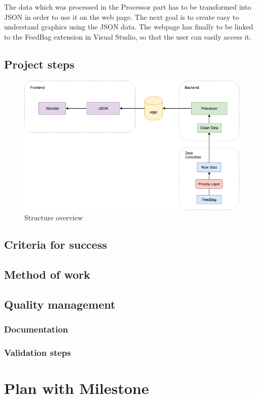 \documentclass{seal_article}
\begin{document}
The data which was processed in the Processor part has to be transformed into JSON in order to use it on the web page. The next goal is to create easy to understand graphics using the JSON data. The webpage has finally to be linked to the FeedBag extension in Visual Studio, so that the user can easily access it.

\subsection{Project steps}
\begin{figure}
  \includegraphics[width=\linewidth]{images/master_project_structure_v2.png}
  \caption{Structure overview}
  \label{fig:struct}
\end{figure}

\subsection{Criteria for success}
\subsection{Method of work}
\subsection{Quality management}
\subsubsection{Documentation}
\subsubsection{Validation steps}

\section{Plan with Milestone}
\end{document}

